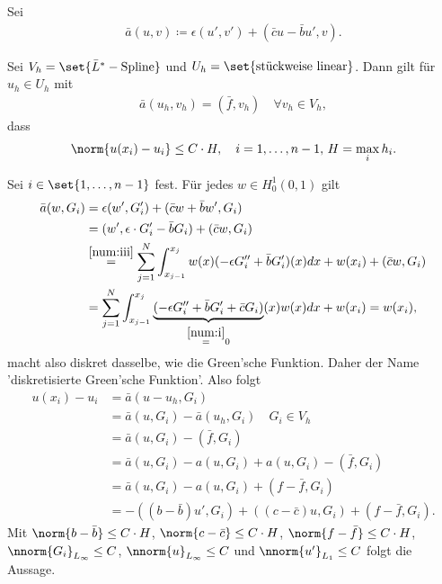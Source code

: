 Sei
\begin{align*}
  \bar a (u, v)\coloneqq \epsilon (u', v') + (\bar c u - \bar b u', v). 
\end{align*}
\begin{satz}\label{thm:6-3}
  Sei $V_{h} = \set{\bar L^{*} - \text{Spline}}$ und $U_{h} = \set{\text{stückweise linear}}$. 
  Dann gilt für $u_{h} \in U_{h}$ mit
  \begin{align*}
    \bar a(u_{h}, v_{h}) = (\bar f, v_{h})\quad \forall v_{h} \in V_{h}, 
  \end{align*}
  dass
  \begin{align*}
    \norm{u(x_{i}) - u_{i}} \leq C\cdot H, \quad i = 1, \dots, n-1, \, H = \max_{i} h_{i}. 
  \end{align*}
\end{satz}
\begin{beweis}
  Sei $i \in \set{1, \dots, n-1}$ fest. Für jedes $w \in H_{0}^{1}(0, 1)$ gilt
  \begin{align*}
    \bar a(w, G_{i}) &= \epsilon (w', G_{i}') + (\bar c w + \bar b w', G_{i})\\
    &= (w', \epsilon\cdot  G_{i}' - \bar b G_{i}) + (\bar c w, G_{i})\\
    &\stackrel{\ref{num:iii}} = \sum_{j = 1}^{N} \int_{x_{j-1}}^{x_{j}} w(x) (-\epsilon G_{i}'' + \bar b G_{i}')(x) dx + w(x_{i}) + (\bar c w, G_{i})\\
    & = \sum_{j = 1}^{N} \int_{x_{j-1}}^{x_{j}}  \underbrace{(-\epsilon G_{i}'' + \bar b G_{i}' + \bar c G_{i})}_{\stackrel{\ref{num:i}}= 0}(x)  w(x)dx + w(x_{i})  = w(x_{i}), 
  \end{align*}
  macht also diskret dasselbe, wie die Green'sche Funktion. Daher der Name 'diskretisierte Green'sche Funktion'. Also folgt
  \begin{align*}
    u(x_{i}) - u_{i} &= \bar a (u - u_{h}, G_{i})\\
    &= \bar a (u, G_{i}) -\bar a (u_{h}, G_{i}) \quad G_{i} \in V_{h}\\
    &= \bar a (u, G_{i}) - (\bar f , G_{i}) \\
    &= \bar a (u, G_{i}) - a(u , G_{i}) + a(u , G_{i})  - (\bar f, G_{i})\\
    &= \bar a (u, G_{i}) - a(u , G_{i}) +( f - \bar f, G_{i})\\
    &= - ((b - \bar b)u', G_{i}) + ((c-\bar c) u, G_{i}) + ( f - \bar f, G_{i}). 
  \end{align*}
  Mit $\norm{b - \bar b} \leq C\cdot H$, $\norm{c - \bar c} \leq C\cdot H$, $\norm{f - \bar f} \leq C\cdot H$, $\nnorm{G_{i}}_{L_{\infty}}\leq C$, $\nnorm{u}_{L_{\infty}}\leq C$ und $\nnorm{u'}_{L_{1}}\leq C$ folgt die Aussage. 
\end{beweis}
